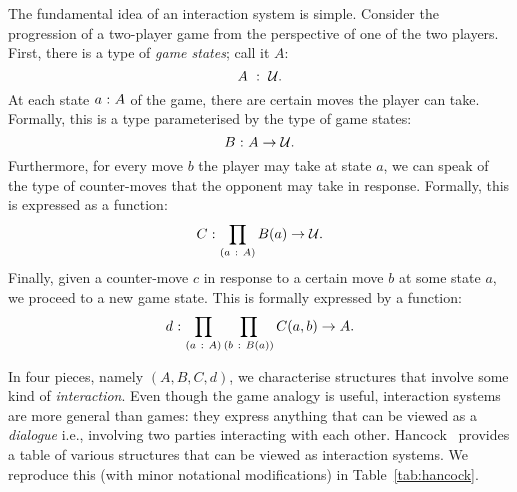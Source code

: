 The fundamental idea of an interaction system is simple. Consider the progression of a
two-player game from the perspective of one of the two players. First, there is a type of
\emph{game states}; call it $A$:
\begin{equation*}
  A~:~\mathcal{U}.
\end{equation*}
At each state $a\hspace{0.1mm}:\hspace{0.1mm}A$ of the game, there are certain moves the player can take.
Formally, this is a type parameterised by the type of game states:
\begin{equation*}
  B\hspace{0.1mm}:\hspace{0.1mm}A \rightarrow \mathcal{U}.
\end{equation*}
Furthermore, for every move $b$ the player may take at state $a$, we can speak of the type
of counter-moves that the opponent may take in response. Formally, this is expressed as
a function:
\begin{equation*}
  C\hspace{0.1mm}:\hspace{0.1mm}\prod_{(a~:~A)} B(a) \rightarrow \mathcal{U}.
\end{equation*}
Finally, given a counter-move $c$ in response to a certain move $b$ at some state $a$, we
proceed to a new game state. This is formally expressed by a function:
\begin{equation*}
  d\hspace{0.1mm}:\hspace{0.1mm}\prod_{(a~:~A)} \prod_{(b~:~B(a))} C(a, b) \rightarrow A.
\end{equation*}

In four pieces, namely $(A, B, C, d)$, we characterise structures that involve some kind
of \emph{interaction}. Even though the game analogy is useful, interaction systems are
more general than games: they express anything that can be viewed as a \emph{dialogue}
i.e., involving two parties interacting with each other.
Hancock~\cite{hancock-interaction-systems} provides a table of various structures that can
be viewed as interaction systems. We reproduce this (with minor notational modifications)
in Table~\ref{tab:hancock}.

